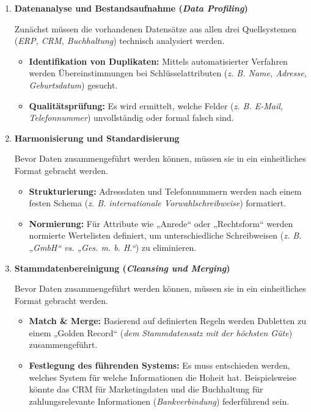 \begin{enumerate}[label=\arabic*.), leftmargin=*]
    \item \textbf{Datenanalyse und Bestandsaufnahme (\textit{Data Profiling})} \par Zunächst müssen die vorhandenen Datensätze aus allen drei Quellsystemen (\textit{\acs{ERP}, \acs{CRM}, Buchhaltung}) technisch analysiert werden. \cite{92}\cite{93}
    \begin{itemize}
        \item \textbf{Identifikation von Duplikaten:} Mittels automatisierter Verfahren werden Übereinstimmungen bei Schlüsselattributen (\textit{\acs{z. B.} Name, Adresse, Geburtsdatum}) gesucht. \cite{94}\cite{95}
        \item \textbf{Qualitätsprüfung:} Es wird ermittelt, welche Felder (\textit{\acs{z. B.} E-Mail, Telefonnummer}) unvollständig oder formal falsch sind. \cite{96}\cite{97}
    \end{itemize}
    \item \textbf{Harmonisierung und Standardisierung} \par Bevor Daten zusammengeführt werden können, müssen sie in ein einheitliches Format gebracht werden. \cite{98}
    \begin{itemize}
        \item \textbf{Strukturierung:} Adressdaten und Telefonnummern werden nach einem festen Schema (\textit{\acs{z. B.} internationale Vorwahlschreibweise}) formatiert. \cite{98}
        \item \textbf{Normierung:} Für Attribute wie „Anrede“ oder „Rechtsform“ werden normierte Wertelisten definiert, um unterschiedliche Schreibweisen (\textit{\acs{z. B.} „GmbH“ \acs{vs.} „Ges. m. b. H.“}) zu eliminieren. \cite{99}
    \end{itemize}
    \item \textbf{Stammdatenbereinigung (\textit{Cleansing und Merging})} \par Bevor Daten zusammengeführt werden können, müssen sie in ein einheitliches Format gebracht werden.
    \begin{itemize}
        \item \textbf{Match \& Merge:} Basierend auf definierten Regeln werden Dubletten zu einem „Golden Record“ (\textit{dem Stammdatensatz mit der höchsten Güte}) zusammengeführt. \cite{100}\cite{101}
        \item \textbf{Festlegung des führenden Systems:} Es muss entschieden werden, welches System für welche Informationen die Hoheit hat. \cite{102} Beispielsweise könnte das CRM für Marketingdaten und die Buchhaltung für zahlungsrelevante Informationen (\textit{Bankverbindung}) federführend sein. \cite{103}\cite{104}

\end{itemize}
\end{enumerate}
